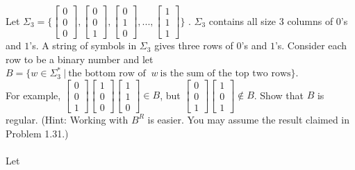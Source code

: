 \begin{enumerate}
Let $\Sigma_3 = \Biggl \{\begin{bmatrix}0 \\ 0 \\ 0\end{bmatrix} , \begin{bmatrix}0 \\0 \\1 \end{bmatrix}, \begin{bmatrix}0 \\1 \\0\end{bmatrix} ,..., \begin{bmatrix}1 \\1 \\1\end{bmatrix} \Biggl \}$ . $\Sigma_3$ contains all size 3 columns of $0$'s and $1$'s. A string of symbols in $\Sigma_3$ gives three rows of $0$'s and $1$'s. Consider each row to be a binary number and let \\
$B =\{w \in \Sigma^\ast_3 ~|~ \text{the bottom row of }~w~\text{is the sum of the top two rows}\}$. \\
For example, $ \begin{bmatrix}0 \\0 \\1\end{bmatrix}  \begin{bmatrix}1 \\0 \\0\end{bmatrix} \begin{bmatrix} 1\\ 1\\ 0\end{bmatrix} \in B $, but $\begin{bmatrix}0 \\0 \\1\end{bmatrix} \begin{bmatrix}1\\ 0\\1\end{bmatrix} \notin B$. Show that $B$ is regular. (Hint: Working with $B^R$ is easier. You may assume the result claimed in Problem 1.31.)
\\
\\
Let


\end{enumerate}
